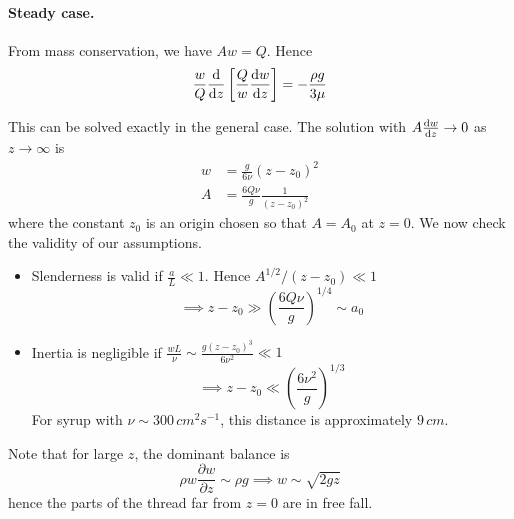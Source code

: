 \documentclass{jknotes}
\begin{document}
\paragraph{Steady case.}
From mass conservation, we have $Aw = Q$. Hence
\begin{equation}
	\frac{w}{Q} \frac{\diffd}{\diffd z} \left[ \frac{Q}{w} \frac{\diffd
	w}{\diffd z} \right] = -\frac{\rho g}{3\mu}
\end{equation}

This can be solved exactly in the general case. The solution with $A
\frac{\diffd w}{\diffd z} \to 0$ as $z \to \infty$ is 
\begin{align}
	w &= \frac{g}{6\nu} (z-z_0)^2 \\
	A &= \frac{6Q \nu}{g} \frac{1}{(z-z_0)^2}
\end{align}
where the constant $z_0$ is an origin chosen so that $A = A_0$ at $z=0$. We
now check the validity of our assumptions.

\begin{itemize}
	\item Slenderness is valid if $\frac{a}{L} \ll 1$. Hence $A^{1/2}/(z-z_0)
		\ll 1$
		\begin{equation}
			\implies z - z_0 \gg \left(\frac{6Q\nu}{g}\right)^{1/4} \sim a_0
		\end{equation}
	\item Inertia is negligible if $\frac{wL}{\nu} \sim
		\frac{g(z-z_0)^3}{6\nu^2} \ll 1$
		\begin{equation}
			\implies z - z_0 \ll \left( \frac{6\nu^2}{g}\right)^{1/3}
		\end{equation}
		For syrup with $\nu \sim 300 \,cm^2 s^{-1}$, this distance is
		approximately $9\,cm$.
\end{itemize}

Note that for large $z$, the dominant balance is
\begin{equation}
	\rho w \frac{\partial w}{\partial z} \sim \rho g \implies w \sim
	\sqrt{2gz}
\end{equation}
hence the parts of the thread far from $z=0$ are in free fall.
\end{document}
